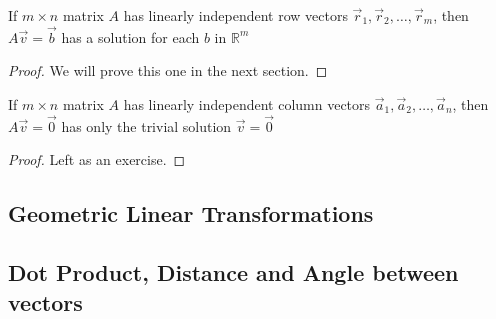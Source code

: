 \begin{proposition}
If $m \times n$ matrix $A$ has linearly independent row vectors $\vec{r}_1, \vec{r}_2, \ldots, \vec{r}_m$, then $A\vec{v}=\vec{b}$ has a solution for each $b$ in 
$\mathbb{R}^m$
\end{proposition}
\begin{proof}
We will prove this one in the next section.
\end{proof}

\begin{proposition}
If $m \times n$ matrix $A$ has linearly independent column vectors $\vec{a}_1, \vec{a}_2, \ldots, \vec{a}_n$, then $A\vec{v}=\vec{0}$ has only the trivial solution 
$\vec{v}=\vec{0}$
\end{proposition}
\begin{proof}
Left as an exercise.
\end{proof}




\subsection{Geometric Linear Transformations}




\subsection{Dot Product, Distance and Angle between vectors}


